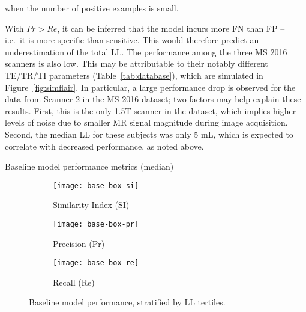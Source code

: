 when the number of positive examples is small.
\par
With $Pr > Re$, it can be inferred that %
the model incurs more FN than FP -- i.e.\ it is more specific than sensitive.
This would therefore predict an underestimation of the total LL.
The performance among the three MS 2016 scanners is also low.
This may be attributable to their notably different TE/TR/TI parameters
(Table~\ref{tab:database}), which are simulated in Figure~\ref{fig:simflair}.
In particular, a large performance drop is observed for
the data from Scanner 2 in the MS 2016 dataset;
two factors may help explain these results.
First, this is the only 1.5T scanner in the dataset,
which implies higher levels of noise due to
smaller MR signal magnitude during image acquisition.
Second, the median LL for these subjects was only 5 mL,
which is expected to correlate with decreased performance, as noted above.
\par
\begin{table}
  \centering
  \caption{Baseline model performance metrics (median)}%
  \label{tab:seg-base}
  
\end{table}
\begin{figure}
  \centering
  \begin{subfigure}{0.32\textwidth}
    \centering
    \texttt{[image: base-box-si]}
    \caption{Similarity Index (SI)}%
    \label{fig:seg-base-si}
  \end{subfigure}
  \begin{subfigure}{0.32\textwidth}
    \centering
    \texttt{[image: base-box-pr]}
    \caption{Precision (Pr)}%
    \label{fig:seg-base-pr}
  \end{subfigure}
  \begin{subfigure}{0.32\textwidth}
    \centering
    \texttt{[image: base-box-re]}
    \caption{Recall (Re)}%
    \label{fig:seg-base-re}
  \end{subfigure}
  \caption{Baseline model performance, stratified by LL tertiles.}%
  \label{fig:seg-base}
\end{figure}
